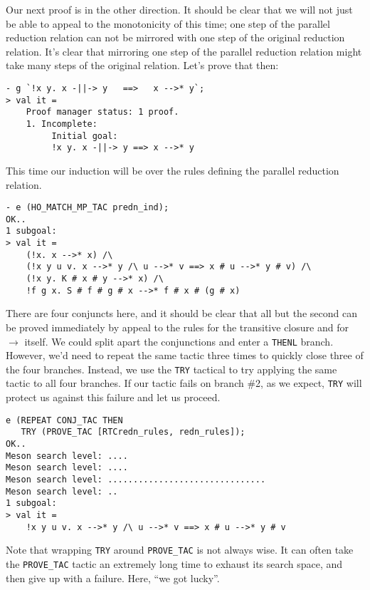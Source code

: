 Our next proof is in the other direction.  It should be clear that we
will not just be able to appeal to the monotonicity of  this
time; one step of the parallel reduction relation can not be mirrored
with one step of the original reduction relation.  It's clear that
mirroring one step of the parallel reduction relation might take many
steps of the original relation.  Let's prove that then:
\begin{session}
\begin{verbatim}
- g `!x y. x -||-> y   ==>   x -->* y`;
> val it =
    Proof manager status: 1 proof.
    1. Incomplete:
         Initial goal:
         !x y. x -||-> y ==> x -->* y
\end{verbatim}
\end{session}
This time our induction will be over the rules defining the parallel
reduction relation.
\begin{session}
\begin{verbatim}
- e (HO_MATCH_MP_TAC predn_ind);
OK..
1 subgoal:
> val it =
    (!x. x -->* x) /\
    (!x y u v. x -->* y /\ u -->* v ==> x # u -->* y # v) /\
    (!x y. K # x # y -->* x) /\
    !f g x. S # f # g # x -->* f # x # (g # x)
\end{verbatim}
\end{session}
    There are four conjuncts here, and it should be clear that all but
    the second can be proved immediately by appeal to the rules for
    the transitive closure and for $\rightarrow$ itself.  We could
    split apart the conjunctions and enter a \texttt{THENL} branch.
    However, we'd need to repeat the same tactic three times to
    quickly close three of the four branches.  Instead, we use the
    \texttt{TRY} tactical to try applying the same tactic to all four
    branches.  If our tactic fails on branch \#2, as we expect,
    \texttt{TRY} will protect us against this failure and let us
    proceed.
\begin{session}
\begin{verbatim}
e (REPEAT CONJ_TAC THEN
   TRY (PROVE_TAC [RTCredn_rules, redn_rules]);
OK..
Meson search level: ....
Meson search level: ....
Meson search level: ...............................
Meson search level: ..
1 subgoal:
> val it =
    !x y u v. x -->* y /\ u -->* v ==> x # u -->* y # v
\end{verbatim}
\end{session}
    Note that wrapping \texttt{TRY} around \texttt{PROVE\_TAC} is not
    always wise.  It can often take the \texttt{PROVE\_TAC} tactic an extremely
    long time to exhaust its search space, and then give up with a
    failure.  Here, ``we got lucky''.


